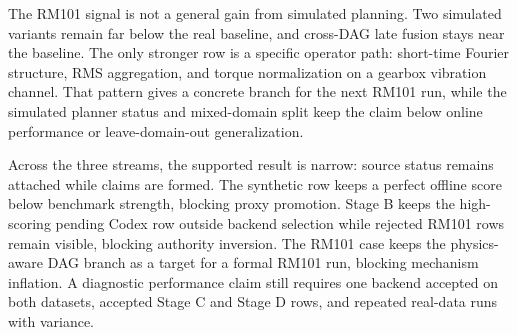 The RM101 signal is not a general gain from simulated planning. Two simulated variants remain far below the real baseline, and cross-DAG late fusion stays near the baseline. The only stronger row is a specific operator path: short-time Fourier structure, RMS aggregation, and torque normalization on a gearbox vibration channel. That pattern gives a concrete branch for the next RM101 run, while the simulated planner status and mixed-domain split keep the claim below online performance or leave-domain-out generalization.

Across the three streams, the supported result is narrow: source status remains attached while claims are formed. The synthetic row keeps a perfect offline score below benchmark strength, blocking proxy promotion. Stage B keeps the high-scoring pending Codex row outside backend selection while rejected RM101 rows remain visible, blocking authority inversion. The RM101 case keeps the physics-aware DAG branch as a target for a formal RM101 run, blocking mechanism inflation. A diagnostic performance claim still requires one backend accepted on both datasets, accepted Stage C and Stage D rows, and repeated real-data runs with variance.
